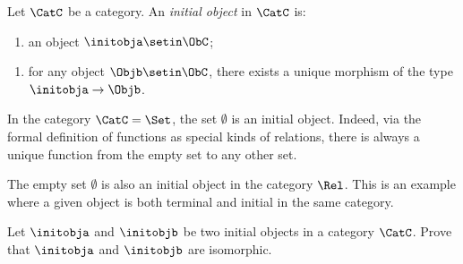 

\begin{ctdefinition}
Let $\CatC$ be a category. An \emph{initial object} in $\CatC$ is: 

\constit
\begin{enumerate}
\item an object $\initobja \setin \ObC$; 
\end{enumerate}
\condit
\begin{enumerate}
\item for any object $\Objb \setin \ObC$, there exists a unique morphism of the type $\initobja \to \Objb$. 
\end{enumerate}
\end{ctdefinition}

\begin{example}
In the category $\CatC = \Set$, the set $\emptyset$ is an initial object. Indeed, via the formal definition of functions as special kinds of relations, there is always a unique function from the empty set to any other set. 
\end{example}

\begin{example}\label{exa:init-obj-Rel}
The empty set $\emptyset$ is also an initial object in the category $\Rel$. This is an example where a given object is both terminal and initial in the same category. 
\end{example}



\begin{gradedexercise}
Let $\initobja$ and $\initobjb$ be two initial objects in a category $\CatC$.  Prove that $\initobja$ and $\initobjb$ are isomorphic.  
\end{gradedexercise}


